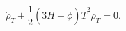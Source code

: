 \begin{equation} \label{conserv-eq2}
\dot\rho_T + \frac12 (3H-\dot\phi)\dot T^2 \rho_T=0.
\end{equation}

